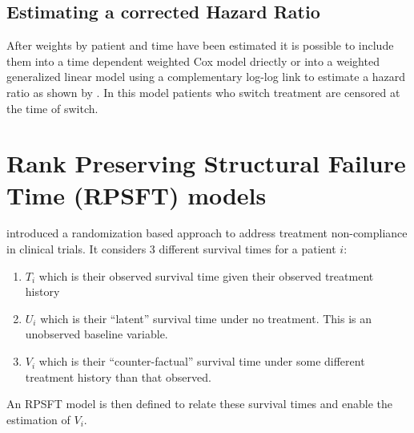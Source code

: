 \subsection{Estimating a corrected Hazard Ratio}

After weights by patient and time have been estimated it is possible to include them into a time dependent weighted Cox model driectly or into a weighted generalized linear model using a complementary log-log link to estimate a hazard ratio as shown by \cite{Hernan2000}. In this model patients who switch treatment are censored at the time of switch.

\section{Rank Preserving Structural Failure Time (RPSFT) models}

\cite{Robins1991} introduced a randomization based approach to address treatment non-compliance in clinical trials. It considers 3 different survival times for a patient $i$:
\begin{enumerate}
\item $T_i$ which is their observed survival time given their observed treatment history
\item $U_i$ which is their ``latent'' survival time  under no treatment. This is an unobserved baseline variable.
\item $V_i$ which is their ``counter-factual'' survival time under some different treatment history than that observed. 
\end{enumerate}
An RPSFT model is then defined to relate these survival times and enable the estimation of $V_i$. 

